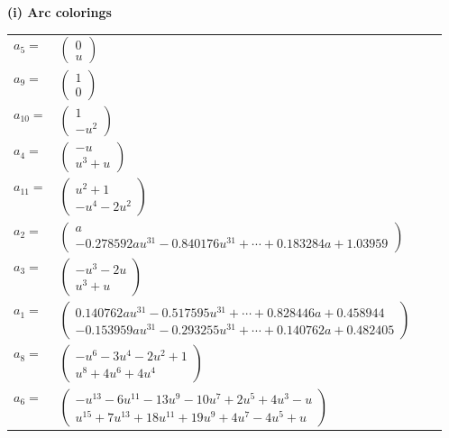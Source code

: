 \documentclass[1p]{elsarticle_modified}
\theoremstyle{definition}
\begin{document}
\flushleft \textbf{(i) Arc colorings}\\
\begin{tabular}{m{7pt} m{180pt} m{7pt} m{180pt} }
\flushright $a_{5}=$&$\begin{pmatrix}0\\u\end{pmatrix}$ \\
\flushright $a_{9}=$&$\begin{pmatrix}1\\0\end{pmatrix}$ \\
\flushright $a_{10}=$&$\begin{pmatrix}1\\- u^2\end{pmatrix}$ \\
\flushright $a_{4}=$&$\begin{pmatrix}- u\\u^3+u\end{pmatrix}$ \\
\flushright $a_{11}=$&$\begin{pmatrix}u^2+1\\- u^4-2 u^2\end{pmatrix}$ \\
\flushright $a_{2}=$&$\begin{pmatrix}a\\-0.278592 a u^{31}-0.840176 u^{31}+\cdots+0.183284 a+1.03959\end{pmatrix}$ \\
\flushright $a_{3}=$&$\begin{pmatrix}- u^3-2 u\\u^3+u\end{pmatrix}$ \\
\flushright $a_{1}=$&$\begin{pmatrix}0.140762 a u^{31}-0.517595 u^{31}+\cdots+0.828446 a+0.458944\\-0.153959 a u^{31}-0.293255 u^{31}+\cdots+0.140762 a+0.482405\end{pmatrix}$ \\
\flushright $a_{8}=$&$\begin{pmatrix}- u^6-3 u^4-2 u^2+1\\u^8+4 u^6+4 u^4\end{pmatrix}$ \\
\flushright $a_{6}=$&$\begin{pmatrix}- u^{13}-6 u^{11}-13 u^9-10 u^7+2 u^5+4 u^3- u\\u^{15}+7 u^{13}+18 u^{11}+19 u^9+4 u^7-4 u^5+u\end{pmatrix}$ \\

\end{tabular}
\end{document}
